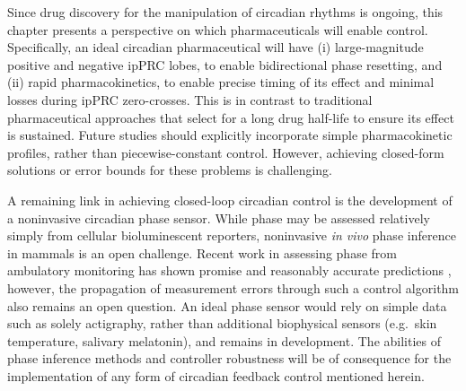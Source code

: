 Since drug discovery for the manipulation of circadian rhythms is ongoing, this chapter presents a perspective on which pharmaceuticals will enable control.
Specifically, an ideal circadian pharmaceutical will have (i) large-magnitude positive and negative ipPRC lobes, to enable bidirectional phase resetting, and (ii) rapid pharmacokinetics, to enable precise timing of its effect and minimal losses during ipPRC zero-crosses.
This is in contrast to traditional pharmaceutical approaches that select for a long drug half-life to ensure its effect is sustained.
Future studies should explicitly incorporate simple pharmacokinetic profiles, rather than piecewise-constant control.
However, achieving closed-form solutions or error bounds for these problems is challenging.

A remaining link in achieving closed-loop circadian control is the development of a noninvasive circadian phase sensor.
While phase may be assessed relatively simply from cellular bioluminescent reporters, noninvasive \textit{in vivo} phase inference in mammals is an open challenge.
Recent work in assessing phase from ambulatory monitoring has shown promise and reasonably accurate predictions \cite{Kolodyazhniy2012}, however, the propagation of measurement errors through such a control algorithm also remains an open question.
An ideal phase sensor would rely on simple data such as solely actigraphy, rather than additional biophysical sensors (e.g.\ skin temperature, salivary melatonin), and remains in development.
The abilities of phase inference methods and controller robustness will be of consequence for the implementation of any form of circadian feedback control mentioned herein.

